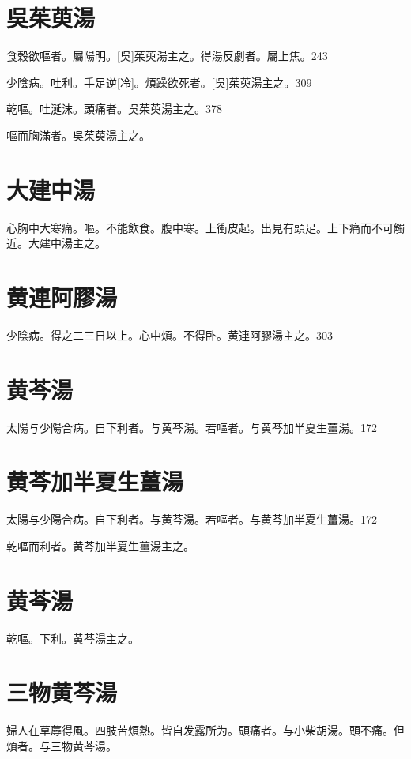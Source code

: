\documentclass[12pt,oneside,UTF8,b5paper]{ctexbook}她她她她她她她
\begin{document}
\section{吳茱萸湯}

食穀欲嘔者。屬陽明。[吳]茱萸湯主之。得湯反劇者。屬上焦。243

少陰病。吐利。手足逆[冷]。煩躁欲死者。[吳]茱萸湯主之。309

乾嘔。吐涎沫。頭痛者。吳茱萸湯主之。378

嘔而胸滿者。吳茱萸湯主之。

\section{大建中湯}

心胸中大寒痛。嘔。不能飲食。腹中寒。上衝皮起。出見有頭足。上下痛而不可觸近。大建中湯主之。

\section{黄連阿膠湯}

少陰病。得之二三日以上。心中煩。不得卧。黄連阿膠湯主之。303

\section{黄芩湯}

太陽与少陽合病。自下利者。与黄芩湯。若嘔者。与黄芩加半夏生薑湯。172

\section{黄芩加半夏生薑湯}

太陽与少陽合病。自下利者。与黄芩湯。若嘔者。与黄芩加半夏生薑湯。172

乾嘔而利者。黄芩加半夏生薑湯主之。

\section{黄芩湯}

乾嘔。下利。黄芩湯主之。

\section{三物黄芩湯}

婦人在草蓐得風。四肢苦煩熱。皆自发露所为。頭痛者。与小柴胡湯。頭不痛。但煩者。与三物黄芩湯。
\end{document}
